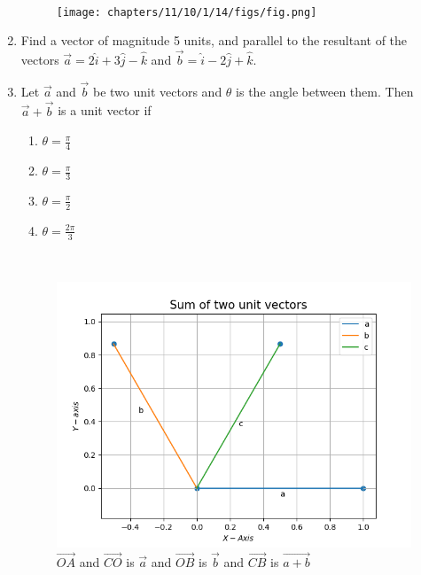 \begin{enumerate}[label=\thesection.\arabic*,ref=\thesection.\theenumi]
\\
\begin{figure}[ht]
\centering
\texttt{[image: chapters/11/10/1/14/figs/fig.png]}
\caption{}
\label{fig:chapters/11/10/1/14/1}
\end{figure}
\solution

\item Find a vector of magnitude 5 units, and parallel to the resultant of the vectors $\vec{a}=2\hat{i}+3\hat{j}-\hat{k}$ and $\vec{b}=\hat{i}-2\hat{j}+\hat{k}$.\\

\item Let $\vec{a}$ and $\vec{b}$ be two unit vectors and $\theta$ is the angle between them. Then $\vec{a}+\vec{b}$ is a unit vector if
	\begin{enumerate}
		\item $\theta = \frac{\pi}{4}$
		\item $\theta = \frac{\pi}{3}$
		\item $\theta = \frac{\pi}{2}$
		\item $\theta = \frac{2\pi}{3}$
			\end{enumerate}
\solution

\\
\begin{figure}[!h]
	\begin{center}
	\includegraphics[width=\columnwidth]{chapters/12/10/5/17/codes/Python/figs/fig.png}
	\end{center}
	\caption{$\vec{OA}$ and $\vec{CO}$ is $\vec{a}$ and $\vec{OB}$ is $\vec{b}$ and $\vec{CB}$ is $\vec{a+b}$}
	\label{fig:12/10/5/17}
\end{figure}
\end{enumerate}
